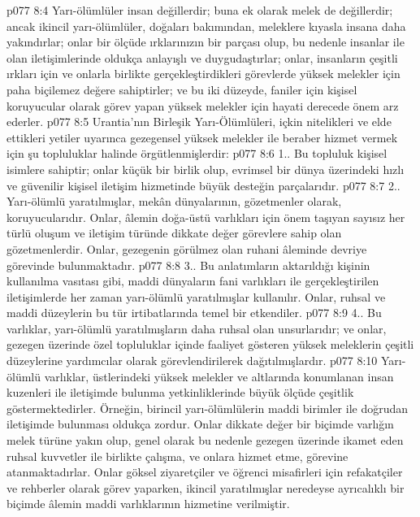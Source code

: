 \vs p077 8:4 Yarı\hyp{}ölümlüler insan değillerdir; buna ek olarak melek de değillerdir; ancak ikincil yarı\hyp{}ölümlüler, doğaları bakımından, meleklere kıyasla insana daha yakındırlar; onlar bir ölçüde ırklarınızın bir parçası olup, bu nedenle insanlar ile olan iletişimlerinde oldukça anlayışlı ve duygudaştırlar; onlar, insanların çeşitli ırkları için ve onlarla birlikte gerçekleştirdikleri görevlerde yüksek melekler için paha biçilemez değere sahiptirler; ve bu iki düzeyde, faniler için kişisel koruyucular olarak görev yapan yüksek melekler için hayati derecede önem arz ederler.
\vs p077 8:5 Urantia’nın Birleşik Yarı\hyp{}Ölümlüleri, içkin nitelikleri ve elde ettikleri yetiler uyarınca gezegensel yüksek melekler ile beraber hizmet vermek için şu topluluklar halinde örgütlenmişlerdir:
\vs p077 8:6 1.. Bu topluluk kişisel isimlere sahiptir; onlar küçük bir birlik olup, evrimsel bir dünya üzerindeki hızlı ve güvenilir kişisel iletişim hizmetinde büyük desteğin parçalarıdır.
\vs p077 8:7 2.\bibnobreakspace {}. Yarı\hyp{}ölümlü yaratılmışlar, mekân dünyalarının, gözetmenler olarak, koruyucularıdır. Onlar, âlemin doğa\hyp{}üstü varlıkları için önem taşıyan sayısız her türlü oluşum ve iletişim türünde dikkate değer görevlere sahip olan gözetmenlerdir. Onlar, gezegenin görülmez olan ruhani âleminde devriye görevinde bulunmaktadır.
\vs p077 8:8 3.\bibnobreakspace {}. Bu anlatımların aktarıldığı kişinin kullanılma vasıtası gibi, maddi dünyaların fani varlıkları ile gerçekleştirilen iletişimlerde her zaman yarı\hyp{}ölümlü yaratılmışlar kullanılır. Onlar, ruhsal ve maddi düzeylerin bu tür irtibatlarında temel bir etkendiler.
\vs p077 8:9 4.. Bu varlıklar, yarı\hyp{}ölümlü yaratılmışların daha ruhsal olan unsurlarıdır; ve onlar, gezegen üzerinde özel topluluklar içinde faaliyet gösteren yüksek meleklerin çeşitli düzeylerine yardımcılar olarak görevlendirilerek dağıtılmışlardır.
\vs p077 8:10 Yarı\hyp{}ölümlü varlıklar, üstlerindeki yüksek melekler ve altlarında konumlanan insan kuzenleri ile iletişimde bulunma yetkinliklerinde büyük ölçüde çeşitlik göstermektedirler. Örneğin, birincil yarı\hyp{}ölümlülerin maddi birimler ile doğrudan iletişimde bulunması oldukça zordur. Onlar dikkate değer bir biçimde varlığın melek türüne yakın olup, genel olarak bu nedenle gezegen üzerinde ikamet eden ruhsal kuvvetler ile birlikte çalışma, ve onlara hizmet etme, görevine atanmaktadırlar. Onlar göksel ziyaretçiler ve öğrenci misafirleri için refakatçiler ve rehberler olarak görev yaparken, ikincil yaratılmışlar neredeyse ayrıcalıklı bir biçimde âlemin maddi varlıklarının hizmetine verilmiştir.
